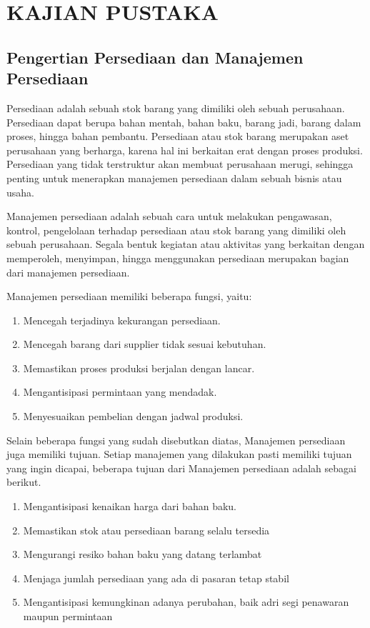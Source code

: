 
\chapter{KAJIAN PUSTAKA} 

\section{Pengertian Persediaan dan Manajemen Persediaan}

Persediaan adalah sebuah stok barang yang dimiliki oleh sebuah perusahaan. Persediaan dapat berupa bahan mentah, bahan baku, barang jadi, barang dalam proses, hingga bahan pembantu. Persediaan atau stok barang merupakan aset perusahaan yang berharga, karena hal ini berkaitan erat dengan proses produksi. Persediaan yang tidak terstruktur akan membuat perusahaan merugi, sehingga penting untuk menerapkan manajemen persediaan dalam sebuah bisnis atau usaha.

Manajemen persediaan adalah sebuah cara untuk melakukan pengawasan, kontrol, pengelolaan terhadap persediaan atau stok barang yang dimiliki oleh sebuah perusahaan. Segala bentuk kegiatan atau aktivitas yang berkaitan dengan memperoleh, menyimpan, hingga menggunakan persediaan merupakan bagian dari manajemen persediaan.

Manajemen persediaan memiliki beberapa fungsi, yaitu:
\begin{enumerate}
	\item Mencegah terjadinya kekurangan persediaan.
	\item Mencegah barang dari supplier tidak sesuai kebutuhan.
	\item Memastikan proses produksi berjalan dengan lancar.
	\item Mengantisipasi permintaan yang mendadak.
	\item Menyesuaikan pembelian dengan jadwal produksi.
\end{enumerate}

Selain beberapa fungsi yang sudah disebutkan diatas, Manajemen persediaan juga memiliki tujuan. Setiap manajemen yang dilakukan pasti memiliki tujuan yang ingin dicapai, beberapa tujuan dari Manajemen persediaan adalah sebagai berikut.
\begin{enumerate}
	\item Mengantisipasi kenaikan harga dari bahan baku.
	\item Memastikan stok atau persediaan barang selalu tersedia
	\item Mengurangi resiko bahan baku yang datang terlambat
	\item Menjaga jumlah persediaan yang ada di pasaran tetap stabil
	\item Mengantisipasi kemungkinan adanya perubahan, baik adri segi penawaran maupun permintaan
\end{enumerate}

